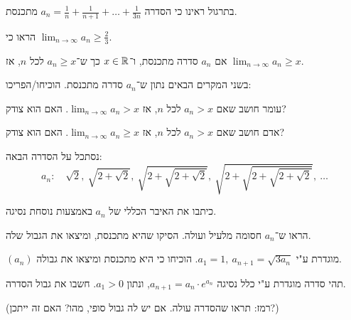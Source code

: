 \documentclass{infi-ex}
\begin{document}
\makeextitle

\begin{question}
\begin{parts}
  \item {} בתרגול ראינו כי הסדרה $a_n=\frac1n+\frac1{n+1}+\dots+\frac1{3n}$ מתכנסת.

     הראו כי $\lim_{n\to\infty}a_n\ge\frac23$.
  \item {} אם $a_n$ סדרה מתכנסת, ו־$x\in\mathbb{R}$ כך ש־$a_n\ge x$ לכל $n$, אז $\lim_{n\to\infty}a_n\ge x$.

     בשני המקרים הבאים נתון ש־$a_n$ סדרה מתכנסת. הוכיחו/הפריכו:
    \begin{parts}
      \item עומר חושב שאם $a_n>x$ לכל $n$, אז $\lim_{n\to\infty}a_n>x$. האם הוא צודק?
      \item אדם חושב שאם $a_n>x$ לכל $n$, אז $\lim_{n\to\infty}a_n\ge x$. האם הוא צודק?
    \end{parts}
\end{parts}
\end{question}

\begin{question}
נסתכל על הסדרה הבאה:
\[ a_n:\quad \sqrt2,\ \sqrt{2+\sqrt2},\ \sqrt{2+\sqrt{2+\sqrt2}},\ \sqrt{2+\sqrt{2+\sqrt{2+\sqrt2}}},\ \dots \]
\begin{parts}
  \item כיתבו את האיבר הכללי של $a_n$ באמצעות נוסחת נסיגה.
  \item הראו ש־$a_n$ חסומה מלעיל ועולה. הסיקו שהיא מתכנסת, ומיצאו את הגבול שלה.
\end{parts}
\end{question}

\begin{question}
$(a_n)$ מוגדרת ע"י $a_1=1,\ a_{n+1}=\sqrt{3a_n}$. הוכיחו כי היא מתכנסת ומיצאו את גבולה.
\end{question}

\begin{question}
תהי סדרה מוגדרת ע"י כלל נסיגה $a_{n+1}=a_n\cdot e^{a_n}$, ונתון $a_1>0$. חשבו את גבול הסדרה.

(רמז: תראו שהסדרה עולה. אם יש לה גבול סופי, מהו? האם זה ייתכן?)
\end{question}
\end{document}
